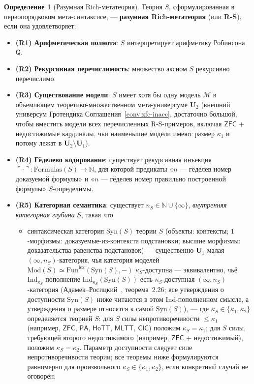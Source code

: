 \documentclass[11pt]{article}
\theoremstyle{plain}
\theoremstyle{definition}
\newtheorem{definition}[theorem]{Определение}
\newcommand{\cM}{\mathcal{M}}
\newcommand{\Fun}{\mathrm{Fun}}
\newcommand{\Syn}{\mathrm{Syn}}
\newcommand{\Mod}{\mathrm{Mod}}
\newcommand{\PA}{\mathsf{PA}}
\newcommand{\ZFC}{\mathsf{ZFC}}
\newcommand{\MLTT}{\mathsf{MLTT}}
\newcommand{\HoTT}{\mathsf{HoTT}}
\newcommand{\CIC}{\mathsf{CIC}}
\begin{document}
\begin{definition}[Разумная Rich-метатеория]\label{def:rs}
Теория $S$, сформулированная в первопорядковом мета-синтаксисе, — \textbf{разумная Rich-метатеория} (или \textbf{R-S}), если она удовлетворяет:
\begin{itemize}
\item \textbf{(R1) Арифметическая полнота}: $S$ интерпретирует арифметику Робинсона $\mathsf{Q}$.
\item \textbf{(R2) Рекурсивная перечислимость}: множество аксиом $S$ рекурсивно перечислимо.
\item \textbf{(R3) Существование модели}: $S$ имеет хотя бы одну модель $\cM$ в объемлющем теоретико-множественном мета-универсуме $\mathbf{U}_2$ (внешний универсум Гротендика Соглашения~\ref{conv:zfc-inacc}, достаточно большой, чтобы вместить модели всех перечисленных R-S-примеров, включая $\ZFC$ + недостижимые кардиналы, чьи наименьшие модели имеют размер $\kappa_1$ и потому лежат в $\mathbf{U}_2 \setminus \mathbf{U}_1$).
\item \textbf{(R4) Гёделево кодирование}: существует рекурсивная инъекция $\ulcorner \cdot \urcorner : \mathrm{Formulas}(S) \to \mathbb{N}$, для которой предикаты «$n$ — гёделев номер доказуемой формулы» и «$n$ — гёделев номер правильно построенной формулы» $S$-определимы.
\item \textbf{(R5) Категорная семантика}: существует $n_S \in \mathbb{N} \cup \{\infty\}$, \emph{внутренняя категорная глубина} $S$, такая что
\begin{itemize}
\item[\textbf{(R5a)}] синтаксическая категория $\Syn(S)$ теории $S$ (объекты: контексты; $1$-морфизмы: доказуемые-из-контекста подстановки; высшие морфизмы: доказательства равенства подстановок) — существенно $\mathbf{U}_1$-малая $(\infty, n_S)$-категория, чья категория моделей $\Mod(S) \simeq \Fun^{\mathrm{lex}}(\Syn(S), -)$ $\kappa_S$-доступна --- эквивалентно, чьё $\mathrm{Ind}_{\kappa_S}$-пополнение $\mathrm{Ind}_{\kappa_S}(\Syn(S))$ есть $\kappa_S$-доступная $(\infty, n_S)$-категория (Адамек--Росицкий~\cite{AdamekRosicky1994}, теорема~2.26; все утверждения о доступности $\Syn(S)$ ниже читаются в этом $\mathrm{Ind}$-пополненном смысле, а утверждения о размере относятся к самой $\Syn(S)$), --- где $\kappa_S \in \{\kappa_1, \kappa_2\}$ определяется теорией $S$: для $S$ силы непротиворечивости $\leq \kappa_1$ (например, $\ZFC$, $\PA$, $\HoTT$, $\MLTT$, $\CIC$) положим $\kappa_S = \kappa_1$; для $S$ силы, требующей второго недостижимого (например, $\ZFC$ + недостижимый), положим $\kappa_S = \kappa_2$. Параметр доступности следует силе непротиворечивости теории; все теоремы ниже формулируются равномерно для произвольного $\kappa_S \in \{\kappa_1, \kappa_2\}$, если конкретный случай не оговорён;

\end{itemize}
\end{itemize}
\end{definition}
\end{document}
